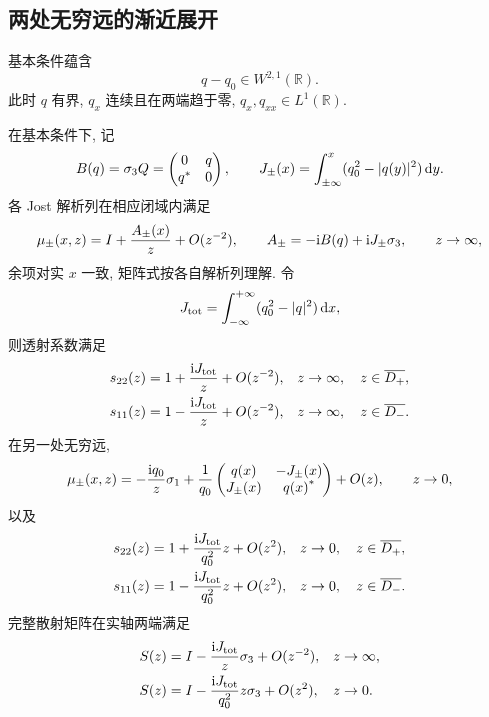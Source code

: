 \subsection{两处无穷远的渐近展开}\label{ch:asymptotics}
基本条件蕴含
\begin{equation}\label{eq:highenergy-assumption}
q-q_0\in W^{2,1}(\mathbb R).
\end{equation}
此时 $q$ 有界, $q_x$ 连续且在两端趋于零, $q_x,q_{xx}\in L^1(\mathbb R)$.

\begin{proposition}\label{prop:highenergy}
在基本条件下, 记
\begin{equation}\label{eq:asymptotic-coefficients}
B(q)=\sigma_3 Q=\begin{pmatrix}0&q\\{q}^{*}&0\end{pmatrix},\qquad
J_\pm(x)=\int_{\pm\infty}^{x}(q_0^2-|q(y)|^2)\,\mathrm{d} y.
\end{equation}
各 Jost 解析列在相应闭域内满足
\begin{equation}\label{eq:mu-highenergy}
\mu_\pm(x,z)=I+\dfrac{A_\pm(x)}{z}+O(z^{-2}),\qquad
A_\pm=-\mathrm{i} B(q)+\mathrm{i} J_\pm\sigma_3,\qquad z\to\infty,
\end{equation}
余项对实 $x$ 一致, 矩阵式按各自解析列理解. 令
\begin{equation*}
J_{\rm tot}=\int_{-\infty}^{+\infty}(q_0^2-|q|^2)\,\mathrm{d} x,
\end{equation*}
则透射系数满足
\begin{equation}\label{eq:transmission-highenergy}
\begin{aligned}
s_{22}(z)&=1+\dfrac{\mathrm{i} J_{\rm tot}}{z}+O(z^{-2}),&&z\to\infty,\quad z\in\overline{D_+},\\
s_{11}(z)&=1-\dfrac{\mathrm{i} J_{\rm tot}}{z}+O(z^{-2}),&&z\to\infty,\quad z\in\overline{D_-}.
\end{aligned}
\end{equation}
在另一处无穷远,
\begin{equation}\label{eq:smallmu}
\mu_\pm(x,z)=-\dfrac{\mathrm{i} q_0}{z}\sigma_1
+\dfrac{1}{q_0}\begin{pmatrix}q(x)&-J_\pm(x)\\J_\pm(x)&{q(x)}^{*}\end{pmatrix}
+O(z),\qquad z\to0,
\end{equation}
以及
\begin{equation}\label{eq:transmission-smallenergy}
\begin{aligned}
s_{22}(z)&=1+\dfrac{\mathrm{i} J_{\rm tot}}{q_0^2}z+O(z^2),&&z\to0,\quad z\in\overline{D_+},\\
s_{11}(z)&=1-\dfrac{\mathrm{i} J_{\rm tot}}{q_0^2}z+O(z^2),&&z\to0,\quad z\in\overline{D_-}.
\end{aligned}
\end{equation}
完整散射矩阵在实轴两端满足
\begin{equation}\label{eq:scattering-two-infinities}
\begin{aligned}
S(z)&=I-\dfrac{\mathrm{i} J_{\rm tot}}{z}\sigma_3+O(z^{-2}),&&z\to\infty,\\
S(z)&=I-\dfrac{\mathrm{i} J_{\rm tot}}{q_0^2}z\sigma_3+O(z^2),&&z\to0.
\end{aligned}
\end{equation}
\end{proposition}
